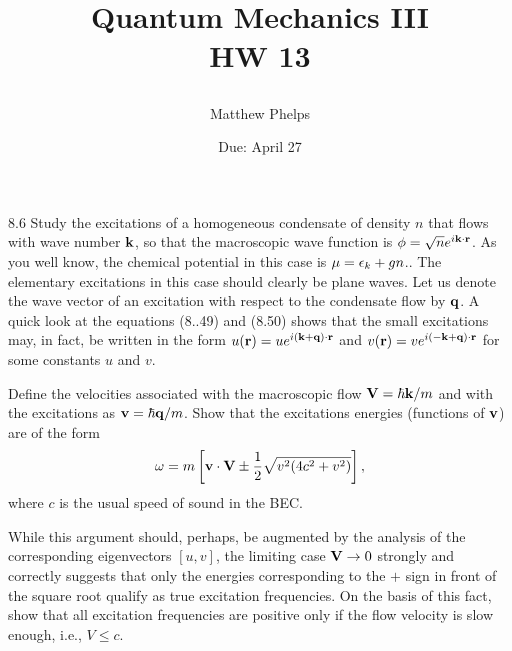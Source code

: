 \documentclass[10pt,letterpaper]{article}
\title{\begin{spacing}{1.2}Quantum Mechanics III\\HW 13\end{spacing}}
\author{Matthew Phelps}
\date{Due: April 27}
\begin{document}
\maketitle

\benum
\item[8.6]
Study the excitations of a homogeneous condensate of density $n$ that flows with wave number $\mathbf{k}$, so that
the macroscopic wave function is $\phi = \sqrt n e^{i\mathbf{k}\cdot \mathbf{r}}$. As you well know, the chemical potential
in this case is $\mu = \epsilon_k+gn$.. The elementary excitations in this case should clearly be plane waves. Let us denote
the wave vector of an excitation with respect to the condensate flow by $\mathbf{q}$. A quick look at the equations
(8..49) and (8.50) shows that the small excitations may, in fact, be written in the form $u(\mathbf{r}) = u e^{i(\mathbf{k}+\mathbf{q})
\cdot \mathbf{r}}$ and $v(\mathbf{r}) = v e^{i(-\mathbf{k}+\mathbf{q})\cdot \mathbf{r}}$ for some constants $u$ and $v$.
\benum
\item
Define the velocities associated with the macroscopic flow $\mathbf{V} = \hbar \mathbf{k}/m$ and with the excitations as
$\mathbf{v} = \hbar \mathbf{q}/m$. Show that the excitations energies (functions of $\mathbf{v}$) are of the form
\[
	\omega = m\left[ \mathbf{v}\cdot \mathbf{V}\pm \frac{1}{2}\sqrt{v^2(4c^2+v^2)}\right],
\]
where $c$ is the usual speed of sound in the BEC.

\item
While this argument should, perhaps, be augmented by the analysis of the corresponding eigenvectors $[u,v]$, the limiting case $\mathbf{V} \to 0$ strongly and correctly suggests that only the energies corresponding to the $+$ sign in
front of the square root qualify as true excitation frequencies. On the basis of this fact, show that all excitation frequencies are positive only if the flow velocity is slow enough, i.e., $V\le c$. \\
\eenum
\end{document}
